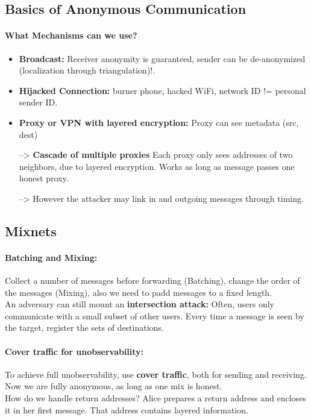 \subsection{Basics of Anonymous Communication}

\paragraph{What Mechanisms can we use?}
\begin{itemize}
    \item \textbf{Broadcast:} Receiver anonymity is guaranteed, sender can be de-anonymized (localization through triangulation)!. 
    \item \textbf{Hijacked Connection:} burner phone, hacked WiFi, network ID != personal sender ID.
    \item \textbf{Proxy or VPN with layered encryption:} Proxy can see metadata (src, dest) 
    \item[-->] \textbf{Cascade of multiple proxies} Each proxy only sees addresses of two neighbors, due to layered encryption. Works as long as message passes one honest proxy. 
    \item[-->] However the attacker may link in and outgoing messages through timing.
\end{itemize}

\subsection{Mixnets}

\paragraph{Batching and Mixing:}
Collect a number of messages before forwarding (Batching), change the order of the messages (Mixing), also we need to padd messages to a fixed length.\\
An adversary can still mount an \textbf{intersection attack:} Often, users only communicate with a
small subset of other users. Every time a message is seen by the target, register the sets of destinations. 

\paragraph{Cover traffic for unobservability:}
To achieve full unobservability, use \textbf{cover traffic}, both for sending and receiving. Now we are fully anonymous, as long as one mix is honest. \\
How do we handle return addresses? Alice prepares a return address and encloses it in her first message. That address contains layered information.


